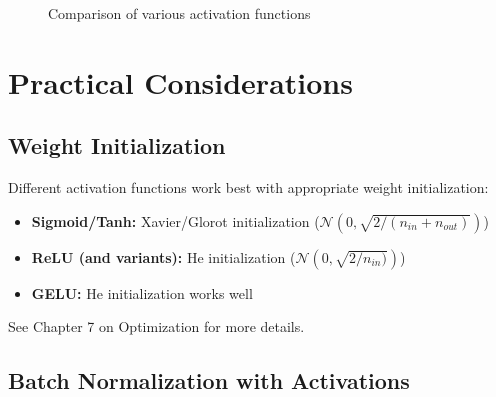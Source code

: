 \begin{figure}[htbp]
    \centering
    \caption[Comparison of activation functions]{Comparison of various activation functions}
    \label{fig:activation_comparison}
\end{figure}

\section{Practical Considerations}

\subsection{Weight Initialization}

Different activation functions work best with appropriate weight initialization:

\begin{itemize}
    \item \textbf{Sigmoid/Tanh:} Xavier/Glorot initialization ($\mathcal{N}(0, \sqrt{2/(n_{in} + n_{out})})$)
    \item \textbf{ReLU (and variants):} He initialization ($\mathcal{N}(0, \sqrt{2/n_{in})})$)
    \item \textbf{GELU:} He initialization works well
\end{itemize}

See Chapter 7 on Optimization for more details.

\subsection{Batch Normalization with Activations}

